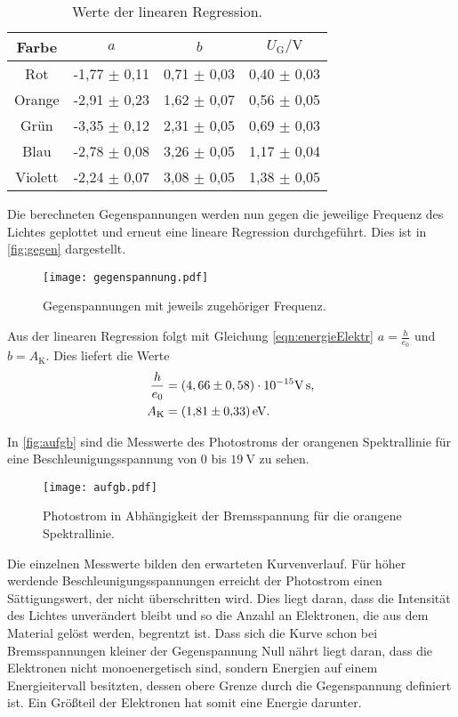 \begin{table}[H]
  \centering
  \begin{tabular}{c c c c}
      \toprule
      Farbe & $a$ & $b$ & $U_\text{G} / \si{\volt}$\\
      \midrule
      Rot &  -1,77 $\pm$ 0,11 & 0,71 $\pm$ 0,03 & 0,40 $\pm$ 0,03 \\
      Orange &  -2,91 $\pm$ 0,23 & 1,62 $\pm$ 0,07 & 0,56 $\pm$ 0,05 \\
      Grün & -3,35 $\pm$ 0,12 & 2,31 $\pm$ 0,05 & 0,69 $\pm$ 0,03 \\
      Blau &  -2,78 $\pm$ 0,08 & 3,26 $\pm$ 0,05 & 1,17 $\pm$ 0,04 \\
      Violett &  -2,24 $\pm$ 0,07 & 3,08 $\pm$ 0,05 & 1,38 $\pm$ 0,05 \\
      \bottomrule
  \end{tabular}
  \caption{Werte der linearen Regression.}
  \label{tab:ug}
\end{table}

\noindent
Die berechneten Gegenspannungen werden nun gegen die jeweilige Frequenz des Lichtes geplottet und erneut eine lineare Regression durchgeführt. Dies ist in \autoref{fig:gegen} dargestellt.

\begin{figure}[H]
  \centering
  \texttt{[image: gegenspannung.pdf]}
  \caption{Gegenspannungen mit jeweils zugehöriger Frequenz.}
  \label{fig:gegen}
\end{figure}

\noindent
Aus der linearen Regression folgt mit Gleichung \eqref{eqn:energieElektr} $a=\frac{h}{e_0}$ und $b=A_\text{K}$. Dies liefert die Werte
\begin{align*}
  \frac{h}{e_0} &= (4,66 \pm 0,58) \cdot 10^{-15} \si{\volt\second}, \\
  A_\text{K} &= \SI{1,81 \pm 0,33}{\electronvolt}.
\end{align*}

\newpage
\noindent
In \autoref{fig:aufgb} sind die Messwerte des Photostroms der orangenen Spektrallinie für eine Beschleunigungsspannung von $0$ bis $\SI{19}{\volt}$ zu sehen.
\begin{figure}[H]
  \centering
  \texttt{[image: aufgb.pdf]}
  \caption{Photostrom in Abhängigkeit der Bremsspannung für die orangene Spektrallinie.}
  \label{fig:aufgb}
\end{figure}
\noindent
Die einzelnen Messwerte bilden den erwarteten Kurvenverlauf. Für höher werdende Beschleunigungsspannungen erreicht der Photostrom einen Sättigungswert, der nicht überschritten wird.
Dies liegt daran, dass die Intensität des Lichtes unverändert bleibt und so die Anzahl an Elektronen, die aus dem Material gelöst werden, begrentzt ist.
\newline
Dass sich die Kurve schon bei Bremsspannungen kleiner der Gegenspannung Null nährt liegt daran, dass die Elektronen nicht monoenergetisch sind, sondern Energien auf einem
Energieitervall besitzten, dessen obere Grenze durch die Gegenspannung definiert ist. Ein Größteil der Elektronen hat somit eine Energie darunter.
